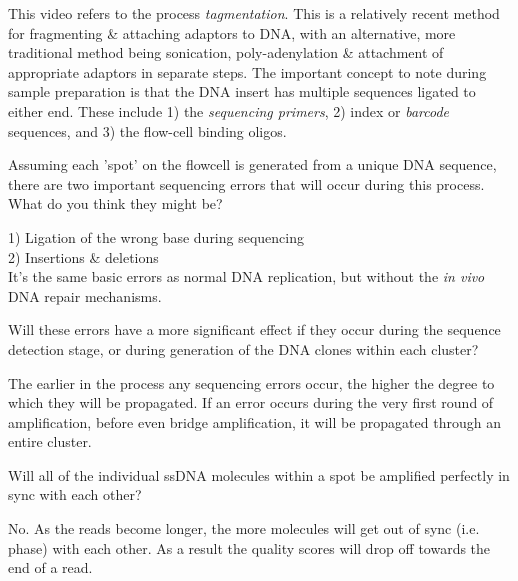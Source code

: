 \begin{note}
This video refers to the process \textit{tagmentation}.
This is a relatively recent method for fragmenting \& attaching adaptors to DNA, with an alternative, more traditional method being sonication, poly-adenylation \& attachment of appropriate adaptors in separate steps.
The important concept to note during sample preparation is that the DNA insert has multiple sequences ligated to either end.
These include 1) the \textit{sequencing primers}, 2) index or \textit{barcode} sequences, and 3) the flow-cell binding oligos.
\end{note}

\begin{questions}
Assuming each 'spot' on the flowcell is generated from a unique DNA sequence, there are two important sequencing errors that will occur during this process.
What do you think they might be? \\
\begin{answer}
1) Ligation of the wrong base during sequencing \\
2) Insertions \& deletions \\
It's the same basic errors as normal DNA replication, but without the \textit{in vivo} DNA repair mechanisms.
\end{answer}

Will these errors have a more significant effect if they occur during the sequence detection stage, or during generation of the DNA clones within each cluster? \\
\begin{answer}
The earlier in the process any sequencing errors occur, the higher the degree to which they will be propagated.
If an error occurs during the very first round of amplification, before even bridge amplification, it will be propagated through an entire cluster. \\
\end{answer}

Will all of the individual ssDNA molecules within a spot be amplified perfectly in sync with each other?\\
\begin{answer}
No.  As the reads become longer, the more molecules will get out of sync (i.e. phase) with each other.
As a result the quality scores will drop off towards the end of a read.
\end{answer}
\end{questions}

